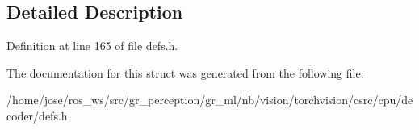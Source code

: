 \subsection{Detailed Description}


Definition at line 165 of file defs.\+h.



The documentation for this struct was generated from the following file\+:\begin{DoxyCompactItemize}
\item 
/home/jose/ros\+\_\+ws/src/gr\+\_\+perception/gr\+\_\+ml/nb/vision/torchvision/csrc/cpu/decoder/defs.\+h\end{DoxyCompactItemize}

